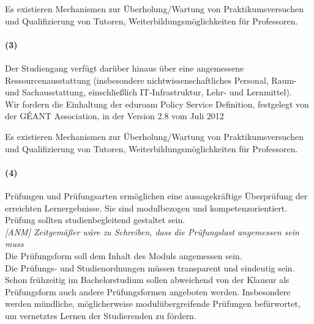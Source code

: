 \documentclass[a4paper]{scrartcl}
\begin{document}
\textcolor{Bernd}{\textbf{\cite{PROT: WiSe2015-RL}} Es existieren Mechanismen zur Überholung/Wartung von Praktikumsversuchen und Qualifizierung von Tutoren, Weiterbildungsmöglichkeiten für Professoren.}

\paragraph{(3)} Der Studiengang verfügt darüber hinaus über eine angemessene Ressourcenausstattung (insbesondere nichtwissenschaftliches Personal, Raum- und Sachausstattung, einschließlich IT-Infrastruktur, Lehr- und Lernmittel).\\

\textcolor{Bernd}{\textbf{\cite{RESO: SoSe15-Eduroam}} Wir fordern die Einhaltung der eduroam Policy Service Definition, festgelegt
von der GÉANT Association, in der Version 2.8 vom Juli 2012}

\textcolor{Bernd}{\textbf{\cite{PROT: WiSe2015-RL}} Es existieren Mechanismen zur Überholung/Wartung von Praktikumsversuchen und Qualifizierung von Tutoren, Weiterbildungsmöglichkeiten für Professoren.}


\paragraph{(4)} Prüfungen und Prüfungsarten ermöglichen eine aussagekräftige Überprüfung der erreichten Lernergebnisse. Sie sind modulbezogen und kompetenzorientiert.\\


\textcolor{Bernd}{\textbf{\cite{RESO: SoSe2002-RL}} Prüfung sollten studienbegleitend gestaltet sein.}\\
\textcolor{Brutus}{\emph{[ANM] Zeitgemäßer wäre zu Schreiben, dass die Prüfungslast angemessen sein muss}}
\\

\textcolor{Bernd}{\textbf{\cite{PROT: WiSe2015-RL}} Die Prüfungsform soll dem Inhalt des Moduls angemessen sein.}\\

\textcolor{Bernd}{\textbf{\cite{RESO: SoSe2010-BaMa}} Die Prüfungs- und Studienordnungen müssen transparent und eindeutig sein.}\\

\textcolor{Bernd}{\textbf{\cite{RESO: SoSe2010-BaMa}} Schon frühzeitig im Bachelorstudium sollen abweichend von der Klausur als Prüfungsform auch andere Prüfungsformen angeboten werden. Insbesondere werden mündliche, möglicherweise modulübergreifende Prüfungen befürwortet, um vernetztes Lernen der Studierenden zu fördern.}\\
\end{document}
